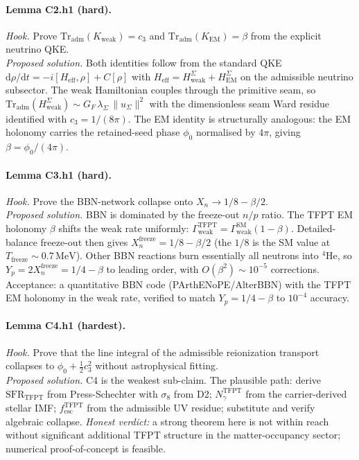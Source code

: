 \documentclass[11pt,a4paper]{article}
\begin{document}
\paragraph{Lemma C2.h1 (hard).}
\emph{Hook.}  Prove
\(\mathrm{Tr}_{\mathrm{adm}}(K_{\mathrm{weak}})=c_3\) and
\(\mathrm{Tr}_{\mathrm{adm}}(K_{\mathrm{EM}})=\beta\) from the
explicit neutrino QKE.\\
\emph{Proposed solution.}  Both identities follow from the standard
QKE \(\mathrm d\rho/\mathrm dt = -i[H_{\mathrm{eff}},\rho]+C[\rho]\)
with \(H_{\mathrm{eff}}=H_{\mathrm{weak}}^\Sigma+H_{\mathrm{EM}}^\Sigma\)
on the admissible neutrino subsector.  The weak Hamiltonian couples
through the primitive seam, so
\(\mathrm{Tr}_{\mathrm{adm}}(H_{\mathrm{weak}}^\Sigma)
\sim G_F\,\lambda_\Sigma\,\|u_\Sigma\|^2\) with the dimensionless
seam Ward residue identified with \(c_3=1/(8\pi)\).  The EM identity
is structurally analogous: the EM holonomy carries the retained-seed
phase \(\phi_0\) normalised by \(4\pi\), giving \(\beta=\phi_0/(4\pi)\).

\paragraph{Lemma C3.h1 (hard).}
\emph{Hook.}  Prove the BBN-network collapse onto \(X_n\to 1/8-\beta/2\).\\
\emph{Proposed solution.}  BBN is dominated by the freeze-out \(n/p\)
ratio.  The TFPT EM holonomy \(\beta\) shifts the weak rate
uniformly: \(\Gamma_{\mathrm{weak}}^{\mathrm{TFPT}}=
\Gamma_{\mathrm{weak}}^{\mathrm{SM}}(1-\beta)\).  Detailed-balance
freeze-out then gives \(X_n^{\mathrm{freeze}}=1/8-\beta/2\) (the
\(1/8\) is the SM value at \(T_{\mathrm{freeze}}\sim 0.7\,\mathrm{MeV}\)).
Other BBN reactions burn essentially all neutrons into \(^4\)He, so
\(Y_p=2 X_n^{\mathrm{freeze}}=1/4-\beta\) to leading order, with
\(O(\beta^2)\sim 10^{-5}\) corrections.  Acceptance: a quantitative
BBN code (PArthENoPE/AlterBBN) with the TFPT EM holonomy in the weak
rate, verified to match \(Y_p=1/4-\beta\) to \(10^{-4}\) accuracy.

\paragraph{Lemma C4.h1 (hardest).}
\emph{Hook.}  Prove that the line integral of the admissible
reionization transport collapses to
\(\phi_0+\tfrac12 c_3^2\) without astrophysical fitting.\\
\emph{Proposed solution.}  C4 is the weakest sub-claim.  The
plausible path: derive
\(\mathrm{SFR}_{\mathrm{TFPT}}\) from Press-Schechter with
\(\sigma_8\) from D2; \(N_\gamma^{\mathrm{TFPT}}\) from the
carrier-derived stellar IMF; \(f_{\mathrm{esc}}^{\mathrm{TFPT}}\) from
the admissible UV residue; substitute and verify algebraic collapse.
\emph{Honest verdict:} a strong theorem here is not within reach
without significant additional TFPT structure in the matter-occupancy
sector; numerical proof-of-concept is feasible.
\end{document}
